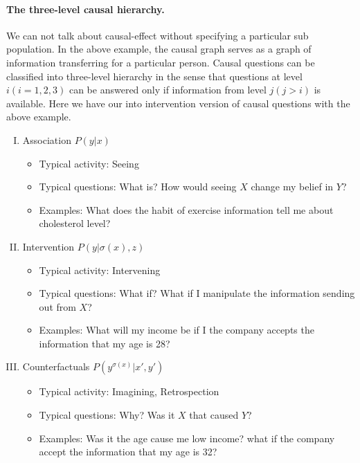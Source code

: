 \paragraph{The three-level causal hierarchy.}  We can not talk about causal-effect without specifying a particular sub population. In the above example, the causal graph serves as a graph of information transferring for a particular person. Causal questions can be classified into three-level hierarchy in the sense that questions at level $i(i=1, 2,3)$ can be answered only if information from level $j(j>i)$ is available. Here we have our into intervention version of causal questions with the above example.
\begin{enumerate}[I)]
	\setlength{\itemsep}{-1pt}
	\item Association $P(y|x)$
	\begin{itemize}
		\setlength{\itemsep}{0pt}		
		\item Typical activity: Seeing
		\item Typical questions: What is? How would seeing $X$ change my belief in $Y$?
		\item Examples: What does the habit of exercise information tell me about cholesterol level? 
	\end{itemize}
	\item Intervention $P(y|\sigma(x), z)$
	\begin{itemize}
		\setlength{\itemsep}{0pt}		
		\item Typical activity: Intervening
		\item Typical questions: What if?  What if I manipulate the information sending out from $X$?
		\item Examples: What will my income be if I the company accepts the information that my age is 28?
	\end{itemize}
	\item Counterfactuals $P(y^{\sigma(x)}|x', y')$
	\begin{itemize}
		\setlength{\itemsep}{0pt}		
		\item Typical activity: Imagining, Retrospection
		\item Typical questions: Why?  Was it $X$ that caused $Y$? 
		\item Examples: Was it the age cause me low income?  what if the company accept the information that my age is 32? 
	\end{itemize}
\end{enumerate}

